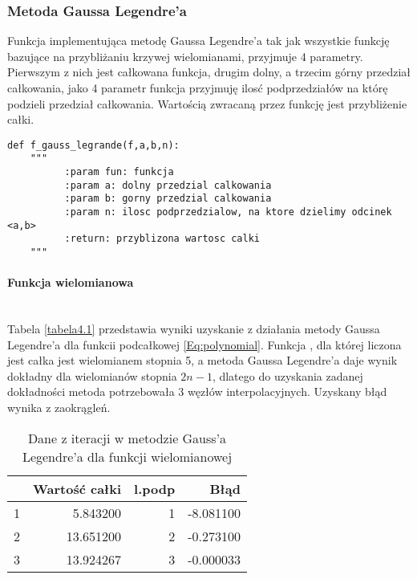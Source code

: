 \documentclass[12pt,twoside]{article}
\begin{document}
\subsubsection{Metoda Gaussa Legendre'a}
Funkcja implementująca metodę Gaussa Legendre'a tak jak wszystkie funkcję bazujące na przybliżaniu krzywej wielomianami, przyjmuje 4 parametry. Pierwszym z nich jest całkowana funkcja, drugim dolny, a trzecim górny przedział całkowania, jako 4 parametr funkcja przyjmuję ilosć podprzedziałów na którę podzieli przedział całkowania. Wartością zwracaną przez funkcję jest przybliżenie całki.

\begin{lstlisting}[caption={Kod w języku python implementujący metodę trapezów}]
def f_gauss_legrande(f,a,b,n):
    """
          :param fun: funkcja
          :param a: dolny przedzial calkowania
          :param b: gorny przedzial calkowania
          :param n: ilosc podprzedzialow, na ktore dzielimy odcinek <a,b>
          :return: przyblizona wartosc calki
    """
\end{lstlisting}
\label{Listing 9}

\paragraph{Funkcja wielomianowa}\mbox{} \\

Tabela \eqref{tabela4.1} przedstawia wyniki uzyskanie z działania metody Gaussa Legendre'a dla funkcii podcałkowej \eqref{Eq:polynomial}. Funkcja , dla której liczona jest całka jest wielomianem stopnia 5, a metoda Gaussa Legendre'a daje wynik dokładny dla wielomianów stopnia $2n-1$, dlatego do uzyskania zadanej dokładności metoda potrzebowała 3 węzłów interpolacyjnych. Uzyskany błąd wynika z zaokrągleń.

\begin{table}[H]
\centering 
\caption{Dane z iteracji w metodzie Gauss'a Legendre'a dla funkcji wielomianowej}
\label{tabela4.1}
\begin{tabular}{lrrr}
\toprule
{} &  Wartość całki &  l.podp &      Błąd \\
\midrule
1 &       5.843200 &       1 & -8.081100 \\
2 &      13.651200 &       2 & -0.273100 \\
3 &      13.924267 &       3 & -0.000033 \\
\bottomrule
\end{tabular}
\end{table}
\end{document}
